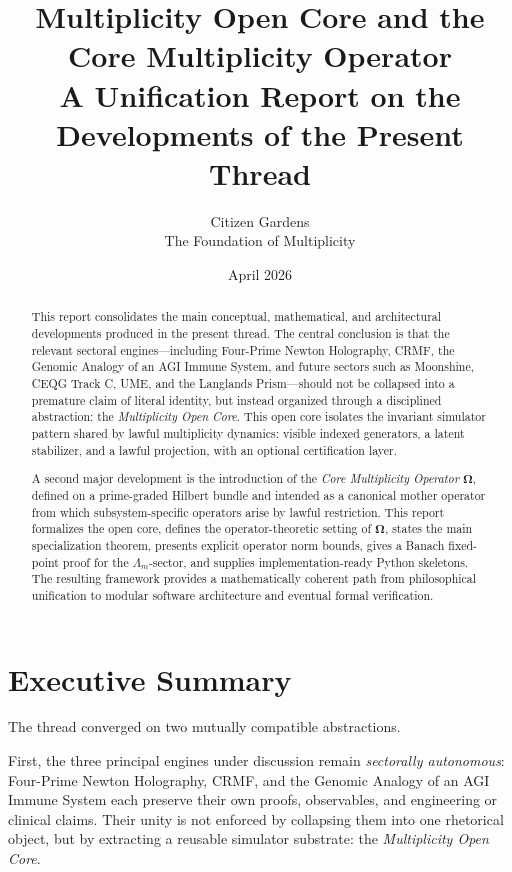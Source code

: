 \documentclass[11pt]{article}
\title{\textbf{Multiplicity Open Core and the Core Multiplicity Operator}\\
\large A Unification Report on the Developments of the Present Thread}
\author{Citizen Gardens \\ The Foundation of Multiplicity}
\date{April 2026}
\theoremstyle{plain}
\theoremstyle{definition}
\theoremstyle{remark}
\newcommand{\Om}{\boldsymbol{\Omega}}
\begin{document}
\maketitle

\begin{abstract}
This report consolidates the main conceptual, mathematical, and architectural developments produced in the present thread. The central conclusion is that the relevant sectoral engines---including Four-Prime Newton Holography, CRMF, the Genomic Analogy of an AGI Immune System, and future sectors such as Moonshine, CEQG Track C, UME, and the Langlands Prism---should not be collapsed into a premature claim of literal identity, but instead organized through a disciplined abstraction: the \emph{Multiplicity Open Core}. This open core isolates the invariant simulator pattern shared by lawful multiplicity dynamics: visible indexed generators, a latent stabilizer, and a lawful projection, with an optional certification layer.

A second major development is the introduction of the \emph{Core Multiplicity Operator} \(\Om\), defined on a prime-graded Hilbert bundle and intended as a canonical mother operator from which subsystem-specific operators arise by lawful restriction. This report formalizes the open core, defines the operator-theoretic setting of \(\Om\), states the main specialization theorem, presents explicit operator norm bounds, gives a Banach fixed-point proof for the \(\Lambda_m\)-sector, and supplies implementation-ready Python skeletons. The resulting framework provides a mathematically coherent path from philosophical unification to modular software architecture and eventual formal verification.
\end{abstract}
\newpage
\tableofcontents
\newpage

\section{Executive Summary}

The thread converged on two mutually compatible abstractions.

First, the three principal engines under discussion remain \emph{sectorally autonomous}: Four-Prime Newton Holography, CRMF, and the Genomic Analogy of an AGI Immune System each preserve their own proofs, observables, and engineering or clinical claims. Their unity is not enforced by collapsing them into one rhetorical object, but by extracting a reusable simulator substrate: the \emph{Multiplicity Open Core}.
\end{document}
